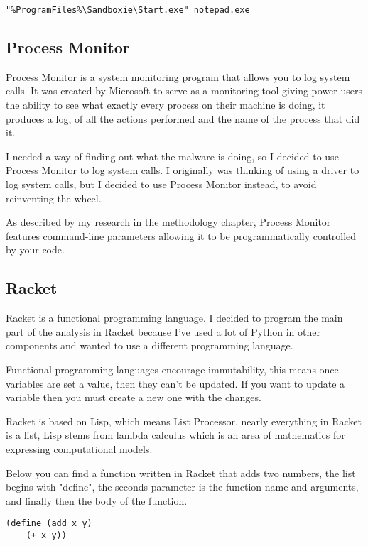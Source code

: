 \begin{lstlisting}
"%ProgramFiles%\Sandboxie\Start.exe" notepad.exe
\end{lstlisting}

\subsection{Process Monitor}
Process Monitor is a system monitoring program that allows you to log system calls.
It was created by Microsoft to serve as a monitoring tool giving power users
the ability to see what exactly every process on their machine is doing,
it produces a log, of all the actions performed and the name of the process that did it.

I needed a way of finding out what the malware is doing,
so I decided to use Process Monitor to log system calls.
I originally was thinking of using a driver to log system calls,
but I decided to use Process Monitor instead, to avoid reinventing the wheel.

As described by my research in the methodology chapter,
Process Monitor features command-line parameters
allowing it to be programmatically controlled by your code.

\subsection{Racket}
Racket is a functional programming language. \cite{racket}
I decided to program the main part of the analysis in Racket
because I've used a lot of Python in other components and
wanted to use a different programming language.

Functional programming languages encourage immutability,
this means once variables are set a value, then they can't be updated.
If you want to update a variable then you must create a new one with
the changes.

Racket is based on Lisp, which means List Processor,
nearly everything in Racket is a list,
Lisp stems from lambda calculus which is an area
of mathematics for expressing computational models.

Below you can find a function written in Racket that adds two numbers,
the list begins with "define", the seconds parameter is the function name and arguments,
and finally then the body of the function.

\begin{lstlisting}
(define (add x y)
    (+ x y))
\end{lstlisting}

